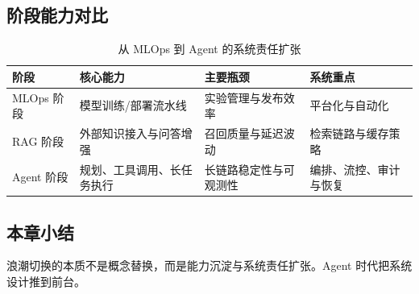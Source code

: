 \subsection{阶段能力对比}
\begin{table}[H]
\centering
\begin{tabular}{p{2.8cm}p{3.6cm}p{3.6cm}p{3.2cm}}
\toprule
\textbf{阶段} & \textbf{核心能力} & \textbf{主要瓶颈} & \textbf{系统重点} \\
\midrule
MLOps 阶段 & 模型训练/部署流水线 & 实验管理与发布效率 & 平台化与自动化 \\
RAG 阶段 & 外部知识接入与问答增强 & 召回质量与延迟波动 & 检索链路与缓存策略 \\
Agent 阶段 & 规划、工具调用、长任务执行 & 长链路稳定性与可观测性 & 编排、流控、审计与恢复 \\
\bottomrule
\end{tabular}
\caption{从 MLOps 到 Agent 的系统责任扩张}
\end{table}

\subsection{本章小结}
浪潮切换的本质不是概念替换，而是能力沉淀与系统责任扩张。Agent 时代把系统设计推到前台。

